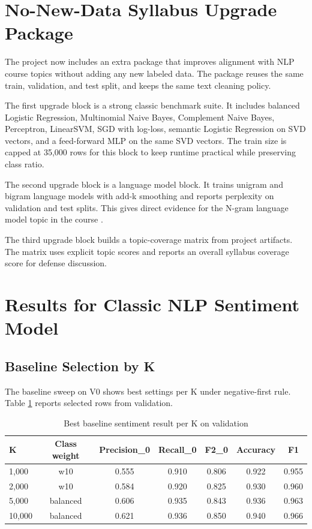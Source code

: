 \documentclass[12pt,a4paper]{article}
\begin{document}
\section{No-New-Data Syllabus Upgrade Package}
The project now includes an extra package that improves alignment with NLP course topics without adding any new labeled data. The package reuses the same train, validation, and test split, and keeps the same text cleaning policy.

The first upgrade block is a strong classic benchmark suite. It includes balanced Logistic Regression, Multinomial Naive Bayes, Complement Naive Bayes, Perceptron, LinearSVM, SGD with log-loss, semantic Logistic Regression on SVD vectors, and a feed-forward MLP on the same SVD vectors. The train size is capped at 35,000 rows for this block to keep runtime practical while preserving class ratio.

The second upgrade block is a language model block. It trains unigram and bigram language models with add-k smoothing and reports perplexity on validation and test splits. This gives direct evidence for the N-gram language model topic in the course \cite{jurafsky2026,manning2008ir}.

The third upgrade block builds a topic-coverage matrix from project artifacts. The matrix uses explicit topic scores and reports an overall syllabus coverage score for defense discussion.

\section{Results for Classic NLP Sentiment Model}
\subsection{Baseline Selection by K}
The baseline sweep on V0 shows best settings per K under negative-first rule. Table \ref{tab:nlp_chi2_best_per_k} reports selected rows from validation.

\begin{table}[H]
\centering
\caption{Best baseline sentiment result per K on validation}
\label{tab:nlp_chi2_best_per_k}
\begin{tabular}{lcccccc}
\toprule
K & Class weight & Precision\_0 & Recall\_0 & F2\_0 & Accuracy & F1 \\
\midrule
1,000 & w10 & 0.555 & 0.910 & 0.806 & 0.922 & 0.955 \\
2,000 & w10 & 0.584 & 0.920 & 0.825 & 0.930 & 0.960 \\
5,000 & balanced & 0.606 & 0.935 & 0.843 & 0.936 & 0.963 \\
10,000 & balanced & 0.621 & 0.936 & 0.850 & 0.940 & 0.966 \\
\bottomrule
\end{tabular}
\end{table}
\end{document}
